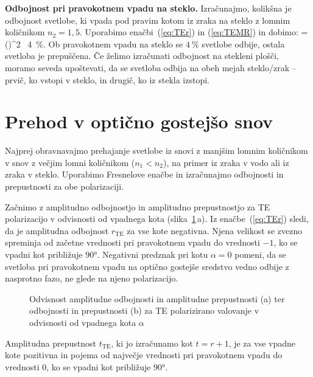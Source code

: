 \begin{example}{\bf Odbojnost pri pravokotnem vpadu na steklo.} 
Izračunajmo, kolikšna je odbojnost svetlobe, ki vpada pod pravim kotom iz zraka na
steklo z lomnim količnikom $n_2=1,5$. Uporabimo enačbi~(\ref{eq:TEr}) in (\ref{eq:TEMR})
in dobimo:
\beq
{} = \left(\right)^2 \approx~4~\%.
\label{eq:04_49}
\eeq
Ob pravokotnem vpadu na steklo se $4~\%$ svetlobe odbije, ostala 
svetloba je prepuščena. Če želimo izračunati odbojnost na stekleni plošči, 
moramo seveda upoštevati, da se svetloba odbija
na obeh mejah steklo/zrak -- prvič, ko vstopi v steklo, in drugič, ko iz stekla
izstopi.
\end{example}

\section{Prehod v optično gostejšo snov}
\label{chap:lomgost}
Najprej obravnavajmo prehajanje svetlobe iz snovi z manjšim lomnim
količnikom v snov z večjim lomni količnikom ($n_1<n_2$), na primer
iz zraka v vodo ali iz zraka v steklo. Uporabimo
Fresnelove enačbe in izračunajmo  odbojnosti in prepustnosti za obe polarizaciji. 

Začnimo z amplitudno odbojnostjo in amplitudno prepustnostjo za TE polarizacijo v odvisnosti
od vpadnega kota (slika~\ref{fig:04_redte}\,a). 
Iz enačbe~(\ref{eq:TEr}) sledi, da je amplitudna odbojnost $r_\mathrm{TE}$
za vse kote negativna. Njena velikost se zvezno spreminja od začetne vrednosti
pri pravokotnem vpadu do vrednosti $-1$, ko se vpadni kot približuje $90\si{\degree}$.
Negativni predznak pri kotu $\alpha =0$ pomeni, da se svetloba pri 
pravokotnem vpadu na optično gostejše sredstvo vedno odbije z nasprotno fazo, ne 
glede na njeno polarizacijo.

\begin{figure}[ht]
\centering
\def\svgwidth{140truemm} 

\caption{Odvisnost amplitudne odbojnosti in amplitudne prepustnosti (a) ter odbojnosti in 
prepustnosti (b) za TE polarizirano valovanje v odvisnosti od vpadnega kota $\alpha$}
\label{fig:04_redte}
\end{figure}

Amplitudna prepustnost $t_\mathrm{TE}$, ki jo izračunamo kot $t=r+1$, je za vse
vpadne kote pozitivna in pojema od največje vrednosti pri pravokotnem vpadu
do vrednosti $0$, ko se vpadni kot približuje $90\si{\degree}$. 

